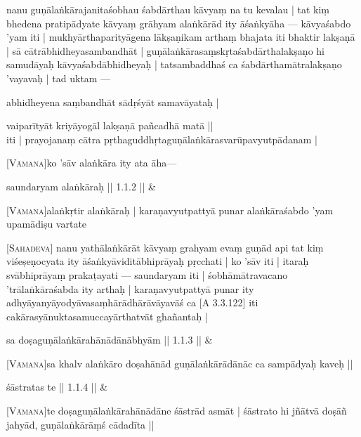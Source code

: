\documentclass[14pt]{extarticle}
\begin{document}
\pstart
 nanu guṇālaṅkārajanitaśobhau śabdārthau kāvyaṃ na tu kevalau | tat kiṃ bhedena pratipādyate kāvyaṃ grāhyam alaṅkārād ity āśaṅkyāha — kāvyaśabdo ’yam iti | mukhyārthaparityāgena lākṣaṇikam arthaṃ bhajata iti bhaktir lakṣaṇā | sā cātrābhidheyasambandhāt | guṇālaṅkārasaṃskṛtaśabdārthalakṣaṇo hi samudāyaḥ kāvyaśabdābhidheyaḥ | tatsambaddhaś ca śabdārthamātralakṣaṇo ’vayavaḥ | tad uktam — 


    abhidheyena saṃbandhāt sādṛśyāt samavāyataḥ | 

\smallskip
vaiparītyāt kriyāyogāl lakṣaṇā pañcadhā matā ||
 \\
iti | prayojanaṃ cātra pṛthaguddhṛtaguṇālaṅkārasvarūpavyutpādanam | 
\pend


\pstart
 \textsc{[Vāmana]}ko ’sāv alaṅkāra ity ata āha— 
\pend


\stanza[\smallskip]

 \large saundaryam alaṅkāraḥ || 1.1.2 || \&



\pstart
 \textsc{[Vāmana]}alaṅkṛtir alaṅkāraḥ | karaṇavyutpattyā punar alaṅkāraśabdo ’yam upamādiṣu vartate 
\pend


\pstart

             \textsc{[Sahadeva]} nanu yathālaṅkārāt kāvyaṃ grahyam evaṃ guṇād api tat kiṃ viśeṣeṇocyata ity āśaṅkyāviditābhiprāyaḥ pṛcchati | ko ’sāv iti | itaraḥ svābhiprāyaṃ prakaṭayati — saundaryam iti | śobhāmātravacano ’trālaṅkāraśabda ity arthaḥ | karaṇavyutpattyā punar ity adhyāyanyāyodyāvasaṃhārādhārāvāyavāś ca [A 3.3.122] iti cakārasyānuktasamuccayārthatvāt ghañantaḥ | 
\pend


\stanza[\smallskip]

 \large sa doṣaguṇālaṅkārahānādānābhyām || 1.1.3 || \&



\pstart
 \textsc{[Vāmana]}sa khalv alaṅkāro doṣahānād guṇālaṅkārādānāc ca sampādyaḥ kaveḥ || 
\pend


\stanza[\smallskip]

 \large śāstratas te || 1.1.4 || \&



\pstart
 \textsc{[Vāmana]}te doṣaguṇālaṅkārahānādāne śāstrād asmāt | śāstrato hi jñātvā doṣāñ jahyād, guṇālaṅkārāṃś cādadīta || 
\pend
\end{document}
